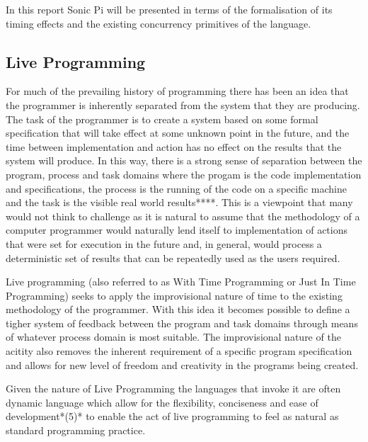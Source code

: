 \documentclass[11pt]{scrartcl}
\begin{document}




In this report Sonic Pi will be presented in terms of the formalisation of its timing effects and the existing concurrency primitives of the language.


\subsection{Live Programming}
For much of the prevailing history of programming there has been an idea that 
the programmer is inherently separated from the system that they are 
producing. The task of the programmer is to create a system based on some 
formal specification that will take effect at some unknown point in the 
future, and the time between implementation and action has no effect on the 
results that the system will produce. In this way, there is a strong sense of 
separation between the program, process and task domains where the progam is 
the code implementation and specifications, the process is the running of the 
code on a specific machine and the task is the visible real world results****. 
This is a viewpoint that many would not think to challenge as it is natural to 
assume that the methodology of a computer programmer would naturally lend 
itself to implementation of actions that were set for execution in the future 
and, in general, would process a deterministic set of results that can be 
repeatedly used as the users required.

Live programming (also referred to as With Time Programming or Just In Time 
Programming) seeks to apply the improvisional nature of time to the existing 
methodology of the programmer. With this idea it becomes possible to define a 
tigher system of feedback between the program and task domains through means 
of whatever process domain is most suitable. The improvisional nature of the 
acitity also removes the inherent requirement of a specific program 
specification and allows for new level of freedom and creativity in the 
programs being created. 

Given the nature of Live Programming the languages that invoke it are often 
dynamic language which allow for the flexibility, conciseness and ease of 
development*(5)* to enable the act of live programming to feel as natural as 
standard programming practice.
\end{document}
